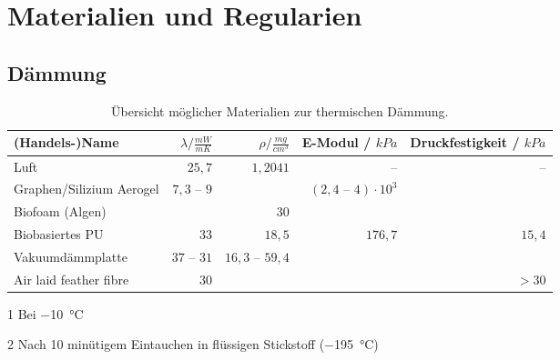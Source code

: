 \chapter{Materialien und Regularien}
	\section{Dämmung}
		\begin{table}[h]
			\centering
			\caption{Übersicht möglicher Materialien zur thermischen Dämmung.}
			\begin{threeparttable}
				\begin{tabular}{@{}lrrrr@{}}
					\toprule
					(Handels-)Name																& \(\lambda / \frac{mW}{m K}\)	& \(\rho / \frac{mg}{cm^3}\)	& E-Modul / \(kPa\) 				& Druckfestigkeit / \(kPa\) \\
					\midrule
					Luft 																		&\(25,7\)						&\(1,2041\)						&--									&-- \\
					Graphen/Silizium Aerogel \cite{silica.graphene.aerogel.Lei.2017} 			& \(7,3 \text{ -- } 9\)			&								&\((2,4 \text{ -- } 4)\cdot 10^3\)	&\\
					Biofoam (Algen) \cite{Biofoam2.Morrison.1994}								&								&30								&									&\\
					Biobasiertes PU \cite{Biobased.PU.HuangX.QiJ.DeHoopC.XieJ.andChenY.2017}	&\(33\)							&\(18,5\)						&\(176,7\)							&\(15,4\)\\
					Vakuumdämmplatte \cite{Vakuumplate.Nagarajan.2013}							&\(37 \text{ -- } 31\)			&\(16,3 \text{ -- } 59,4\)		&									&\\
					Air laid feather fibre \cite{air.laid.feather.fibre.Zhao.2020} 				& \(30\)\tnote{1} 		&								&									&\(> 30\)\tnote{2}\\
					\bottomrule
				\end{tabular}
				\begin{tablenotes}
					\footnotesize
					\item[1] Bei \SI{-10}{\celsius}
					\item[2] Nach 10 minütigem Eintauchen in flüssigen Stickstoff (\SI{-195}{\celsius})
				\end{tablenotes}
			\end{threeparttable}
		\end{table}